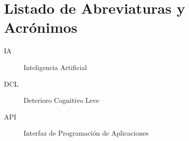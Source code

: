     \chapter*{Listado de Abreviaturas y Acrónimos}
    
    \begin{description}
        \item[IA] Inteligencia Artificial
        \item[DCL] Deterioro Cognitivo Leve
        \item[API] Interfaz de Programación de Aplicaciones
    \end{description}